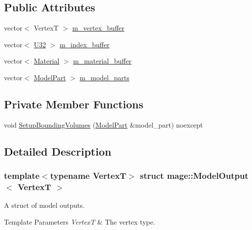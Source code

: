 \subsection*{Public Attributes}
\begin{DoxyCompactItemize}
\item 
vector$<$ VertexT $>$ \hyperlink{structmage_1_1_model_output_a4d669b5fee2d6a1bc993a94b0a2d5580}{m\+\_\+vertex\+\_\+buffer}
\item 
vector$<$ \hyperlink{namespacemage_a41c104c036fba3756a74e19f793eeaa1}{U32} $>$ \hyperlink{structmage_1_1_model_output_a0d38026bd5211748810a27b54375689d}{m\+\_\+index\+\_\+buffer}
\item 
vector$<$ \hyperlink{classmage_1_1_material}{Material} $>$ \hyperlink{structmage_1_1_model_output_a3bfdb493d92a83b40a8b363a96e89a0c}{m\+\_\+material\+\_\+buffer}
\item 
vector$<$ \hyperlink{structmage_1_1_model_part}{Model\+Part} $>$ \hyperlink{structmage_1_1_model_output_a86df369ff4959458ee6991c36e6aa01a}{m\+\_\+model\+\_\+parts}
\end{DoxyCompactItemize}
\subsection*{Private Member Functions}
\begin{DoxyCompactItemize}
\item 
void \hyperlink{structmage_1_1_model_output_aec05a0a43d141b8b8260e741314615c1}{Setup\+Bounding\+Volumes} (\hyperlink{structmage_1_1_model_part}{Model\+Part} \&model\+\_\+part) noexcept
\end{DoxyCompactItemize}


\subsection{Detailed Description}
\subsubsection*{template$<$typename VertexT$>$\newline
struct mage\+::\+Model\+Output$<$ Vertex\+T $>$}

A struct of model outputs.


\begin{DoxyTemplParams}{Template Parameters}
{\em VertexT} & The vertex type. \\
\hline
\end{DoxyTemplParams}


